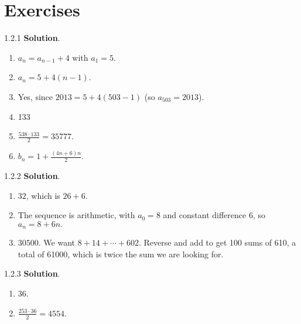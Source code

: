 \documentclass[11pt,]{book}
\theoremstyle{ptxplainnotitle}
\theoremstyle{ptxplaintitle}
\theoremstyle{ptxdefinitionnotitle}
\theoremstyle{ptxdefinitiontitle}
\theoremstyle{ptxdefinitionnotitle}
\theoremstyle{ptxdefinitiontitle}
\theoremstyle{ptxdefinitionnotitle}
\theoremstyle{ptxdefinitiontitle}
\theoremstyle{ptxdefinitiontitlenonumber}
\theoremstyle{ptxdefinitiontitlenonumber}
\numberwithin{equation}{chapter}
\begin{document}
\section*{Exercises}
\begin{divisionexercise}{1.2.1}
\textbf{Solution}.\quad%
\hypertarget{p-223}{}%
\leavevmode%
\begin{enumerate}[label=(\alph*)]
\item\hypertarget{li-126}{}\(a_n = a_{n-1} + 4\) with \(a_1 = 5\).%
\item\hypertarget{li-127}{}\(a_n = 5 + 4(n-1)\).%
\item\hypertarget{li-128}{}\hypertarget{p-224}{}%
Yes, since \(2013 = 5 + 4(503-1)\) (so \(a_{503} = 2013\)).%
\item\hypertarget{li-129}{}\hypertarget{p-225}{}%
133%
\item\hypertarget{li-130}{}\(\frac{538\cdot 133}{2} = 35777\).%
\item\hypertarget{li-131}{}\(b_n = 1 + \frac{(4n+6)n}{2}\).%
\end{enumerate}
%
\end{divisionexercise}%
\begin{divisionexercise}{1.2.2}
\textbf{Solution}.\quad%
\hypertarget{p-240}{}%
\leavevmode%
\begin{enumerate}[label=\alph*.]
\item\hypertarget{li-141}{}\hypertarget{p-241}{}%
\(32\text{,}\) which is \(26+6\text{.}\)%
\item\hypertarget{li-142}{}\hypertarget{p-242}{}%
The sequence is arithmetic, with \(a_0 = 8\) and constant difference 6, so \(a_n = 8 + 6n\text{.}\)%
\item\hypertarget{li-143}{}\hypertarget{p-243}{}%
\(30500\text{.}\)  We want \(8 + 14 + \cdots + 602\text{.}\)  Reverse and add to get 100 sums of 610, a total of 61000, which is twice the sum we are looking for.%
\end{enumerate}
%
\end{divisionexercise}%
\begin{divisionexercise}{1.2.3}
\textbf{Solution}.\quad%
\hypertarget{p-256}{}%
\leavevmode%
\begin{enumerate}[label=\alph*.]
\item\hypertarget{li-150}{}\hypertarget{p-257}{}%
36.%
\item\hypertarget{li-151}{}\hypertarget{p-258}{}%
\(\frac{253 \cdot 36}{2} = 4554\text{.}\)%
\end{enumerate}
%
\end{divisionexercise}%
\end{document}
